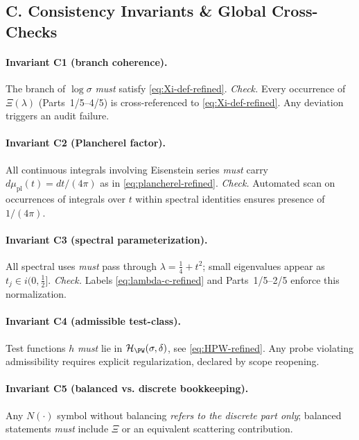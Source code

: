 
\subsection*{C. Consistency Invariants \& Global Cross-Checks}
\label{subsec:consistency-refined}

\paragraph{Invariant C1 (branch coherence).}
The branch of $\log \sigma$ \emph{must} satisfy \eqref{eq:Xi-def-refined}.
\emph{Check.} Every occurrence of $\Xi(\lambda)$ (Parts~1/5–4/5) is cross-referenced to \eqref{eq:Xi-def-refined}. Any deviation triggers an audit failure.

\paragraph{Invariant C2 (Plancherel factor).}
All continuous integrals involving Eisenstein series \emph{must} carry $d\mu_{\mathrm{pl}}(t)=dt/(4\pi)$ as in \eqref{eq:plancherel-refined}.
\emph{Check.} Automated scan on occurrences of integrals over $t$ within spectral identities ensures presence of $1/(4\pi)$.

\paragraph{Invariant C3 (spectral parameterization).}
All spectral uses \emph{must} pass through $\lambda=\tfrac14+t^2$; small eigenvalues appear as $t_j\in i(0,\tfrac12]$.
\emph{Check.} Labels \eqref{eq:lambda-c-refined} and Parts~1/5–2/5 enforce this normalization.

\paragraph{Invariant C4 (admissible test-class).}
Test functions $h$ \emph{must} lie in $\mathcal H_{\PW}(\sigma,\delta)$, see \eqref{eq:HPW-refined}. Any probe violating admissibility requires explicit regularization, declared by scope reopening.

\paragraph{Invariant C5 (balanced vs. discrete bookkeeping).}
Any $N(\cdot)$ symbol without balancing \emph{refers to the discrete part only}; balanced statements \emph{must} include $\Xi$ or an equivalent scattering contribution.

